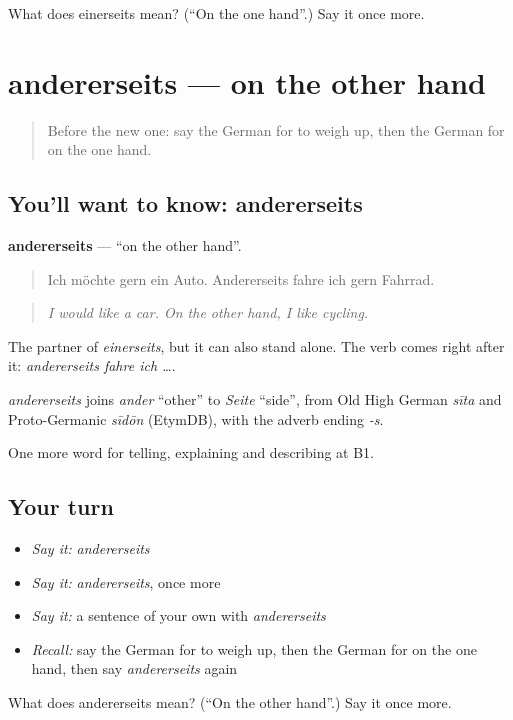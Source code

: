 \begin{tcolorbox}[breakable,colback=teal!4,colframe=teal!35!black,title={Before you move on}]
What does einerseits mean? (\textquotedblleft{}On the one hand\textquotedblright{}.) Say it once more.
\end{tcolorbox}
\section[andererseits]{andererseits — on the other hand}

\label{lesson:GE-C336-andererseits}



\begin{quote}
Before the new one: say the German for to weigh up, then the German for on the one hand.
\end{quote}

\subsection*{You'll want to know: andererseits}
\textbf{andererseits} — \textquotedblleft{}on the other hand\textquotedblright{}.

\begin{quote}
Ich möchte gern ein Auto. Andererseits fahre ich gern Fahrrad.
\end{quote}

\begin{quote}
\emph{I would like a car. On the other hand, I like cycling.}
\end{quote}

The partner of \emph{einerseits}, but it can also stand alone. The verb comes right after it: \emph{andererseits fahre ich …}.

\begin{cousinweb}
\emph{andererseits} joins \emph{ander} \textquotedblleft{}other\textquotedblright{} to \emph{Seite} \textquotedblleft{}side\textquotedblright{}, from Old High German \emph{sīta} and Proto-Germanic \emph{sīdōn} (EtymDB), with the adverb ending \emph{-s}.
\end{cousinweb}

\begin{grammarlens}[title={What you've built}]
One more word for telling, explaining and describing at B1.
\end{grammarlens}

\subsection*{Your turn}
\begin{itemize}
\raggedright
  \item \emph{Say it:} \emph{andererseits}
  \item \emph{Say it:} \emph{andererseits}, once more
  \item \emph{Say it:} a sentence of your own with \emph{andererseits}
  \item \emph{Recall:} say the German for to weigh up, then the German for on the one hand, then say \emph{andererseits} again
\end{itemize}

\begin{tcolorbox}[breakable,colback=teal!4,colframe=teal!35!black,title={Before you move on}]
What does andererseits mean? (\textquotedblleft{}On the other hand\textquotedblright{}.) Say it once more.
\end{tcolorbox}
